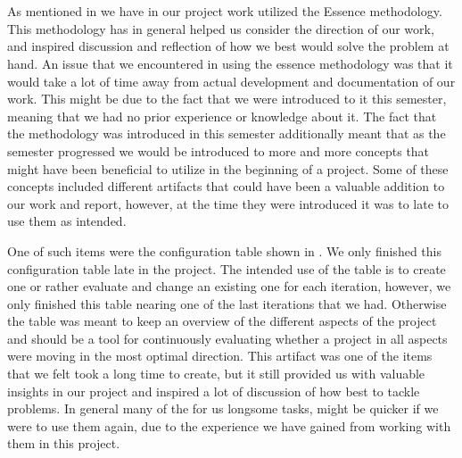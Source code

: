 \\\\
As mentioned in  we have in our project work utilized the Essence methodology. This methodology has in general helped us consider the direction of our work, and inspired discussion and reflection of how we best would solve the problem at hand. An issue that we encountered in using the essence methodology was that it would take a lot of time away from actual development and documentation of our work. This might be due to the fact that we were introduced to it this semester, meaning that we had no prior experience or knowledge about it. The fact that the methodology was introduced in this semester additionally meant that as the semester progressed we would be introduced to more and more concepts that might have been beneficial to utilize in the beginning of a project. Some of these concepts included different artifacts that could have been a valuable addition to our work and report, however, at the time they were introduced it was to late to use them as intended.


One of such items were the configuration table shown in . We only finished this configuration table late in the project. The intended use of the table is to create one or rather evaluate and change an existing one for each iteration, however, we only finished this table nearing one of the last iterations that we had. Otherwise the table was meant to keep an overview of the different aspects of the project and should be a tool for continuously evaluating whether a project in all aspects were moving in the most optimal direction. This artifact was one of the items that we felt took a long time to create, but it still provided us with valuable insights in our project and inspired a lot of discussion of how best to tackle problems. In general many of the for us longsome tasks, might be quicker if we were to use them again, due to the experience we have gained from working with them in this project. 

